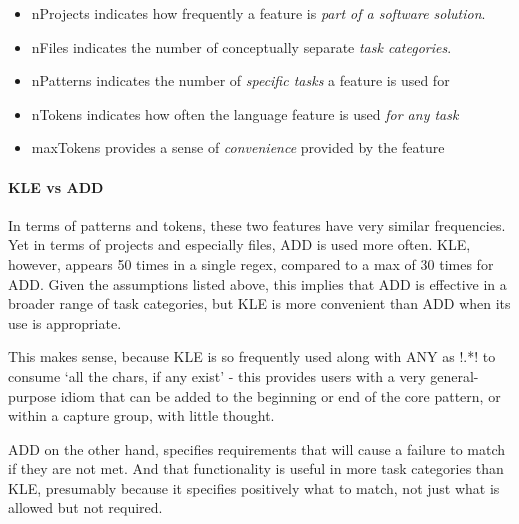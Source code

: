 \begin{itemize}[noitemsep,topsep=0pt]
\item \begin{normalsize}nProjects indicates how frequently a feature is \emph{part of a software solution}.\end{normalsize}
\item \begin{normalsize}nFiles indicates the number of conceptually separate \emph{task categories}.\end{normalsize}
\item \begin{normalsize}nPatterns indicates the number of \emph{specific tasks} a feature is used for\end{normalsize}
\item \begin{normalsize}nTokens indicates how often the language feature is used \emph{for any task}\end{normalsize}
\item \begin{normalsize}maxTokens provides a sense of \emph{convenience} provided by the feature\end{normalsize}
\end{itemize}

\paragraph{KLE vs ADD} In terms of patterns and tokens, these two features have very similar frequencies.  Yet in terms of projects and especially files, ADD is used more often.  KLE, however, appears 50 times in a single regex, compared to a max of 30 times for ADD.  Given the assumptions listed above, this implies that ADD is effective in a broader range of task categories, but KLE is more convenient than ADD when its use is appropriate.

This makes sense, because KLE is so frequently used along with ANY as \cverb!.*! to consume `all the chars, if any exist' - this provides users with a very general-purpose idiom that can be added to the beginning or end of the core pattern, or within a capture group, with little thought.

ADD on the other hand, specifies requirements that will cause a failure to match if they are not met.  And that functionality is useful in more task categories than KLE, presumably because it specifies positively what to match, not just what is allowed but not required.

